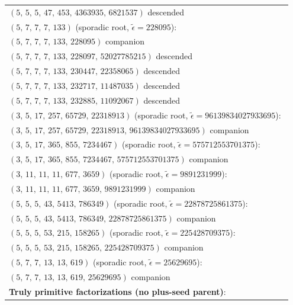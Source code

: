 \documentclass[11pt]{article}
\theoremstyle{definition}
\theoremstyle{remark}
\newcommand{\eps}{\tilde{\epsilon}}
\begin{document}
\begin{longtable}{@{}p{0.95\linewidth}@{}}
\quad $(5,\,5,\,5,\,47,\,453,\,4363935,\,6821537)$ \hfill {\small descended} \\
\addlinespace
\textbf{$(5,\,7,\,7,\,7,\,133)$} \quad (sporadic root, $\eps = 228095$): \\
\quad $(5,\,7,\,7,\,7,\,133,\,228095)$ \hfill {\small companion} \\
\quad $(5,\,7,\,7,\,7,\,133,\,228097,\,52027785215)$ \hfill {\small descended} \\
\quad $(5,\,7,\,7,\,7,\,133,\,230447,\,22358065)$ \hfill {\small descended} \\
\quad $(5,\,7,\,7,\,7,\,133,\,232717,\,11487035)$ \hfill {\small descended} \\
\quad $(5,\,7,\,7,\,7,\,133,\,232885,\,11092067)$ \hfill {\small descended} \\
\addlinespace
\textbf{$(3,\,5,\,17,\,257,\,65729,\,22318913)$} \quad (sporadic root, $\eps = 96139834027933695$): \\
\quad $(3,\,5,\,17,\,257,\,65729,\,22318913,\,96139834027933695)$ \hfill {\small companion} \\
\addlinespace
\textbf{$(3,\,5,\,17,\,365,\,855,\,7234467)$} \quad (sporadic root, $\eps = 575712553701375$): \\
\quad $(3,\,5,\,17,\,365,\,855,\,7234467,\,575712553701375)$ \hfill {\small companion} \\
\addlinespace
\textbf{$(3,\,11,\,11,\,11,\,677,\,3659)$} \quad (sporadic root, $\eps = 9891231999$): \\
\quad $(3,\,11,\,11,\,11,\,677,\,3659,\,9891231999)$ \hfill {\small companion} \\
\addlinespace
\textbf{$(5,\,5,\,5,\,43,\,5413,\,786349)$} \quad (sporadic root, $\eps = 22878725861375$): \\
\quad $(5,\,5,\,5,\,43,\,5413,\,786349,\,22878725861375)$ \hfill {\small companion} \\
\addlinespace
\textbf{$(5,\,5,\,5,\,53,\,215,\,158265)$} \quad (sporadic root, $\eps = 225428709375$): \\
\quad $(5,\,5,\,5,\,53,\,215,\,158265,\,225428709375)$ \hfill {\small companion} \\
\addlinespace
\textbf{$(5,\,7,\,7,\,13,\,13,\,619)$} \quad (sporadic root, $\eps = 25629695$): \\
\quad $(5,\,7,\,7,\,13,\,13,\,619,\,25629695)$ \hfill {\small companion} \\
\addlinespace
\midrule
\textbf{Truly primitive factorizations (no plus-seed parent)}: \\

\end{longtable}
\end{document}
